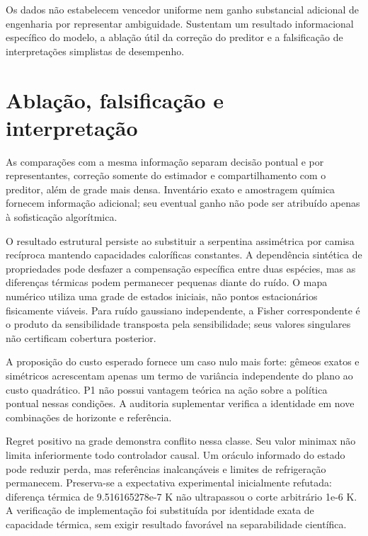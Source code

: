 \documentclass[
  11pt,
]{article}
\begin{document}
Os dados não estabelecem vencedor uniforme nem ganho substancial
adicional de engenharia por representar ambiguidade. Sustentam um
resultado informacional específico do modelo, a ablação útil da correção
do preditor e a falsificação de interpretações simplistas de desempenho.

\hypertarget{ablauxe7uxe3o-falsificauxe7uxe3o-e-interpretauxe7uxe3o}{%
\section{Ablação, falsificação e
interpretação}\label{ablauxe7uxe3o-falsificauxe7uxe3o-e-interpretauxe7uxe3o}}

As comparações com a mesma informação separam decisão pontual e por
representantes, correção somente do estimador e compartilhamento com o
preditor, além de grade mais densa. Inventário exato e amostragem
química fornecem informação adicional; seu eventual ganho não pode ser
atribuído apenas à sofisticação algorítmica.

O resultado estrutural persiste ao substituir a serpentina assimétrica
por camisa recíproca mantendo capacidades caloríficas constantes. A
dependência sintética de propriedades pode desfazer a compensação
específica entre duas espécies, mas as diferenças térmicas podem
permanecer pequenas diante do ruído. O mapa numérico utiliza uma grade
de estados iniciais, não pontos estacionários fisicamente viáveis. Para
ruído gaussiano independente, a Fisher correspondente é o produto da
sensibilidade transposta pela sensibilidade; seus valores singulares não
certificam cobertura posterior.

A proposição do custo esperado fornece um caso nulo mais forte: gêmeos
exatos e simétricos acrescentam apenas um termo de variância
independente do plano ao custo quadrático. P1 não possui vantagem
teórica na ação sobre a política pontual nessas condições. A auditoria
suplementar verifica a identidade em nove combinações de horizonte e
referência.

Regret positivo na grade demonstra conflito nessa classe. Seu valor
minimax não limita inferiormente todo controlador causal. Um oráculo
informado do estado pode reduzir perda, mas referências inalcançáveis e
limites de refrigeração permanecem. Preserva-se a expectativa
experimental inicialmente refutada: diferença térmica de 9.516165278e-7
K não ultrapassou o corte arbitrário 1e-6 K. A verificação de
implementação foi substituída por identidade exata de capacidade
térmica, sem exigir resultado favorável na separabilidade científica.
\end{document}
